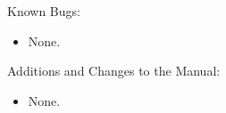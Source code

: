 \noindent Known Bugs:

\begin{itemize}

\item None.

\end{itemize}

\noindent Additions and Changes to the Manual:

\begin{itemize}

\item None.

\end{itemize}

